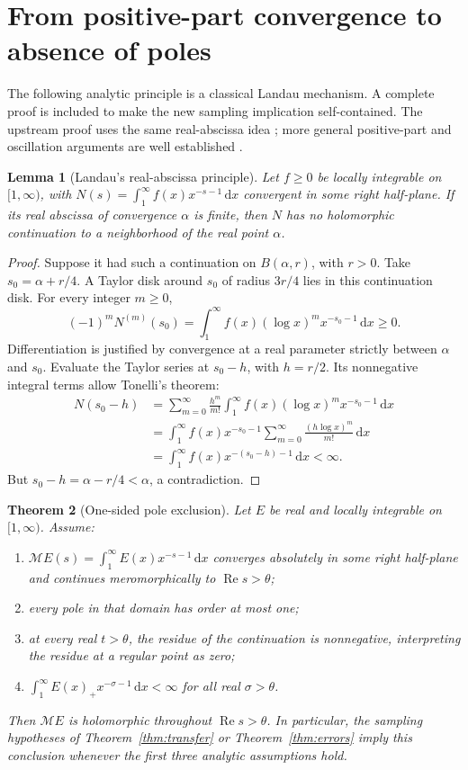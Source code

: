 \documentclass[11pt]{article}
\newtheorem{theorem}{Theorem}[section]
\newtheorem{lemma}[theorem]{Lemma}
\theoremstyle{definition}
\newcommand{\Rea}{\operatorname{Re}}
\newcommand{\Mell}{\mathcal M}
\newcommand{\dd}{\,\mathrm d}
\begin{document}
\section{From positive-part convergence to absence of poles}
\label{sec:landau}

The following analytic principle is a classical Landau mechanism. A
complete proof is included to make the new sampling implication
self-contained. The upstream proof uses the same real-abscissa idea
\cite{landau}; more general positive-part and oscillation arguments are
well established \cite{brs,odesky}.

\begin{lemma}[Landau's real-abscissa principle]\label{lem:landau}
Let \(f\geq0\) be locally integrable on \([1,\infty)\), with
\(N(s)=\int_1^\infty f(x)x^{-s-1}\dd x\) convergent in some right
half-plane. If its real abscissa of convergence \(\alpha\) is finite,
then \(N\) has no holomorphic continuation to a neighborhood of
the real point \(\alpha\).
\end{lemma}
\begin{proof}
Suppose it had such a continuation on \(B(\alpha,r)\), with \(r>0\).
Take \(s_0=\alpha+r/4\). A Taylor disk around \(s_0\) of radius
\(3r/4\) lies in this continuation disk. For every integer \(m\geq0\),
\[
 (-1)^mN^{(m)}(s_0)
 =\int_1^\infty f(x)(\log x)^m x^{-s_0-1}\dd x\geq0.
\]
Differentiation is justified by convergence at a real parameter strictly
between \(\alpha\) and \(s_0\). Evaluate the Taylor series at
\(s_0-h\), with \(h=r/2\). Its nonnegative integral terms allow
Tonelli's theorem:
\begin{align*}
 N(s_0-h)
 &=\sum_{m=0}^\infty\frac{h^m}{m!}
       \int_1^\infty f(x)(\log x)^m x^{-s_0-1}\dd x\\
 &=\int_1^\infty f(x)x^{-s_0-1}
       \sum_{m=0}^\infty\frac{(h\log x)^m}{m!}\dd x\\
 &=\int_1^\infty f(x)x^{-(s_0-h)-1}\dd x<\infty.
\end{align*}
But \(s_0-h=\alpha-r/4<\alpha\), a contradiction.
\end{proof}

\begin{theorem}[One-sided pole exclusion]\label{thm:poles}
Let \(E\) be real and locally integrable on \([1,\infty)\). Assume:
\begin{enumerate}
\item \(\Mell E(s)=\int_1^\infty E(x)x^{-s-1}\dd x\) converges
absolutely in some right half-plane and continues meromorphically to
\(\Rea s>\theta\);
\item every pole in that domain has order at most one;
\item at every real \(t>\theta\), the residue of the continuation
is nonnegative, interpreting the residue at a regular point as zero;
\item \(\int_1^\infty E(x)_+x^{-\sigma-1}\dd x<\infty\) for all
real \(\sigma>\theta\).
\end{enumerate}
Then \(\Mell E\) is holomorphic throughout \(\Rea s>\theta\).
In particular, the sampling hypotheses of Theorem~\ref{thm:transfer}
or Theorem~\ref{thm:errors} imply this conclusion whenever the first
three analytic assumptions hold.
\end{theorem}
\end{document}
